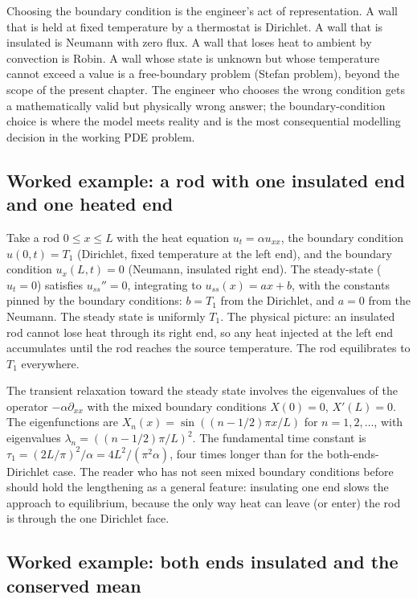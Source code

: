 Choosing the boundary condition is the engineer's act of
representation. A wall that is held at fixed temperature by a
thermostat is Dirichlet. A wall that is insulated is Neumann with
zero flux. A wall that loses heat to ambient by convection is
Robin. A wall whose state is unknown but whose temperature
cannot exceed a value is a free-boundary problem (Stefan
problem), beyond the scope of the present chapter. The engineer
who chooses the wrong condition gets a mathematically valid but
physically wrong answer; the boundary-condition choice is where
the model meets reality and is the most consequential modelling
decision in the working PDE problem.

\subsection{Worked example: a rod with one insulated end and one heated end}

Take a rod $0 \leq x \leq L$ with the heat equation $u_{t} =
\alpha u_{xx}$, the boundary condition $u(0, t) = T_{1}$
(Dirichlet, fixed temperature at the left end), and the boundary
condition $u_{x}(L, t) = 0$ (Neumann, insulated right end). The
steady-state ($u_{t} = 0$) satisfies $u_{ss}'' = 0$, integrating
to $u_{ss}(x) = a x + b$, with the constants pinned by the boundary
conditions: $b = T_{1}$ from the Dirichlet, and $a = 0$ from the
Neumann. The steady state is uniformly $T_{1}$. The physical
picture: an insulated rod cannot lose heat through its right end,
so any heat injected at the left end accumulates until the rod
reaches the source temperature. The rod equilibrates to $T_{1}$
everywhere.

The transient relaxation toward the steady state involves the
eigenvalues of the operator $-\alpha \partial_{xx}$ with the
mixed boundary conditions $X(0) = 0$, $X'(L) = 0$. The
eigenfunctions are $X_{n}(x) = \sin((n - 1/2)\pi x/L)$ for $n =
1, 2, \ldots$, with eigenvalues $\lambda_{n} = ((n - 1/2)\pi/L)^{2}$.
The fundamental time constant is $\tau_{1} = (2 L/\pi)^{2}/\alpha
= 4 L^{2}/(\pi^{2} \alpha)$, four times longer than for the
both-ends-Dirichlet case. The reader who has not seen mixed
boundary conditions before should hold the lengthening as a
general feature: insulating one end slows the approach to
equilibrium, because the only way heat can leave (or enter) the
rod is through the one Dirichlet face.

\subsection{Worked example: both ends insulated and the conserved mean}

